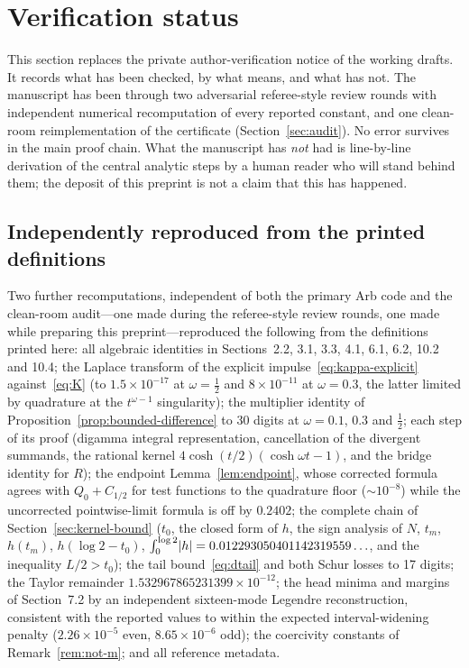 \documentclass[11pt,a4paper]{article}
\DeclarePairedDelimiter{\abs}{\lvert}{\rvert}
\theoremstyle{plain}
\theoremstyle{definition}
\numberwithin{equation}{section}
\begin{document}
\section{Verification status}\label{sec:verification}

This section replaces the private author-verification notice of the working
drafts. It records what has been checked, by what means, and what has not.
The manuscript has been through two adversarial referee-style review rounds
with independent numerical recomputation of every reported constant, and one
clean-room reimplementation of the certificate (Section~\ref{sec:audit}). No
error survives in the main proof chain. What the manuscript has \emph{not}
had is line-by-line derivation of the central analytic steps by a human
reader who will stand behind them; the deposit of this preprint is not a
claim that this has happened.

\subsection*{Independently reproduced from the printed definitions}

Two further recomputations, independent of both the primary Arb code and the
clean-room audit---one made during the referee-style review rounds, one made
while preparing this preprint---reproduced the following from the definitions
printed here:
all algebraic identities in Sections~2.2, 3.1, 3.3, 4.1, 6.1, 6.2, 10.2 and
10.4; the Laplace transform of the explicit impulse~\eqref{eq:kappa-explicit}
against~\eqref{eq:K} (to $1.5\times10^{-17}$ at $\omega=\tfrac12$ and
$8\times10^{-11}$ at $\omega=0.3$, the latter limited by quadrature at the
$t^{\omega-1}$ singularity); the multiplier identity of
Proposition~\ref{prop:bounded-difference} to 30 digits at $\omega=0.1$, $0.3$
and $\tfrac12$; each step of its proof (digamma integral representation,
cancellation of the divergent summands, the rational kernel
$4\cosh(t/2)(\cosh\omega t-1)$, and the bridge identity for $R$); the
endpoint Lemma~\ref{lem:endpoint}, whose corrected formula agrees with
$Q_0+C_{1/2}$ for test functions to the quadrature floor
($\sim10^{-8}$) while the uncorrected pointwise-limit formula is off by
$0.2402$; the complete chain of Section~\ref{sec:kernel-bound} ($t_0$, the
closed form of $h$, the sign analysis of $N$, $t_m$, $h(t_m)$,
$h(\log2-t_0)$, $\int_0^{\log2}\abs h=0.012293050401142319559\ldots$, and the
inequality $L/2>t_0$); the tail bound~\eqref{eq:dtail} and both Schur losses
to 17 digits; the Taylor remainder $1.532967865231399\times10^{-12}$; the
head minima and margins of Section~7.2 by an independent sixteen-mode
Legendre reconstruction, consistent with the reported values to within the
expected interval-widening penalty ($2.26\times10^{-5}$ even,
$8.65\times10^{-6}$ odd); the coercivity constants of
Remark~\ref{rem:not-m}; and all reference metadata.
\end{document}
